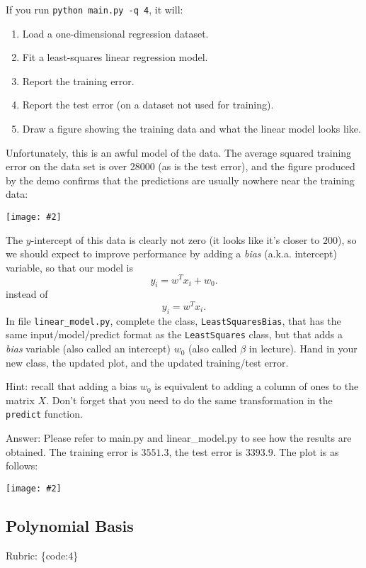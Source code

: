 \documentclass{article}
\def\rubric#1{\gre{Rubric: \{#1\}}}{}
\def\blu#1{{\color{blu}#1}}
\def\gre#1{{\color{gre}#1}}
\newcommand{\centerfig}[2]{\begin{center}\texttt{[image: \#2]}\end{center}}
\def\enum#1{\begin{enumerate}#1\end{enumerate}}
\begin{document}
If you run  \verb|python main.py -q 4|, it will:
\enum{
\item Load a one-dimensional regression dataset.
\item Fit a least-squares linear regression model.
\item Report the training error.
\item Report the test error (on a dataset not used for training).
\item Draw a figure showing the training data and what the linear model looks like.
}
Unfortunately, this is an awful model of the data. The average squared training error on the data set is over 28000
(as is the test error), and the figure produced by the demo confirms that the predictions are usually nowhere near
 the training data:
\centerfig{.5}{../figs/least_squares_no_bias.pdf}
The $y$-intercept of this data is clearly not zero (it looks like it's closer to $200$),
so we should expect to improve performance by adding a \emph{bias} (a.k.a. intercept) variable, so that our model is
\[
y_i = w^Tx_i + w_0.
\]
instead of
\[
y_i = w^Tx_i.
\]
\blu{In file \texttt{linear\string_model.py}, complete the class, \texttt{LeastSquaresBias},
that has the same input/model/predict format as the \texttt{LeastSquares} class,
but that adds a \emph{bias} variable (also called an intercept) $w_0$ (also called $\beta$ in lecture). Hand in your new class, the updated plot,
and the updated training/test error.}

Hint: recall that adding a bias $w_0$ is equivalent to adding a column of ones to the matrix $X$. Don't forget that you need to do the same transformation in the \texttt{predict} function.

\gre{Answer:
Please refer to main.py and linear\_model.py to see how the results are obtained.
The training error is $3551.3$, the test error is $3393.9$. The plot is as follows:
}

\centerfig{.5}{../figs/least_squares_with_bias.pdf}

\subsection{Polynomial Basis}
\rubric{code:4}
\end{document}
